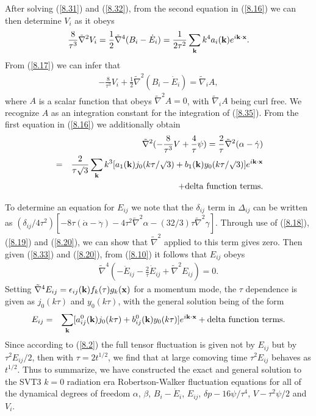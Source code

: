 After solving (\ref{8.31}) and (\ref{8.32}), from the second equation in (\ref{8.16}) we can then determine $V_i$ as it obeys 
%
\begin{eqnarray}
\frac{8}{\tau^3}\tilde{\nabla}^2V_{i}=\frac{1}{2}\tilde{\nabla}^4(B_i-\dot{E}_i)=\frac{1}{2\tau^2}\sum_{\bf k}k^4a_i({\bf k})e^{i{\bf k}\cdot{\bf x}}.
\label{8.35}
\end{eqnarray}
%
From (\ref{8.17}) we can infer that 
%
\begin{eqnarray}
-\frac{8}{\tau^3}V_{i}+\frac{1}{2}\tilde{\nabla}^2(B_i-\dot{E}_i)=\tilde{\nabla}_iA,
\label{8.36}
\end{eqnarray}
%
where $A$ is a scalar function that obeys $\tilde{\nabla}^2A=0$, with $\tilde{\nabla}_iA$ being curl free. We recognize $A$ as an integration constant for the integration of (\ref{8.35}). From the first equation in (\ref{8.16}) we additionally obtain
%
\begin{eqnarray}
&&\tilde{\nabla}^2(-\frac{8}{\tau^3}V+\frac{4}{\tau}\psi)
=\frac{2}{\tau}\tilde{\nabla}^2(\alpha-\dot{\gamma})
\nonumber\\
&=&\frac{2}{\tau\surd{3}}\sum_{\bf k}k^3[a_1({\bf k})j_0(k\tau/\surd{3})+b_1({\bf k})y_0(k\tau/\surd{3})]e^{i{\bf k}\cdot{\bf x}}
\nonumber\\
&&+ {\rm delta~function~terms.}
\label{8.37}
\end{eqnarray}
%

To determine an equation for $E_{ij}$ we note that the $\delta_{ij}$ term in $\Delta _{ij}$ can be written as 
$(\delta_{ij}/4\tau^2)[-8\tau(\dot{\alpha}-\ddot{\gamma})-4\tau^2\tilde{\nabla}^2\alpha-(32/3)\tau\tilde{\nabla}^2\gamma]$. Through use of (\ref{8.18}), (\ref{8.19}) and (\ref{8.20}), we can show that $\tilde{\nabla}^2$ applied to this term gives zero. Then given (\ref{8.33}) and (\ref{8.20}), from (\ref{8.10}) it follows that $E_{ij}$ obeys 
%
\begin{eqnarray}
\tilde{\nabla}^4\left(-\ddot{E}_{ij}-\frac{2}{\tau}\dot{E}_{ij}+\tilde{\nabla}^2E_{ij}\right)=0.
\label{8.38}
\end{eqnarray}
%
Setting $\tilde{\nabla}^4E_{ij}=\epsilon_{ij}({\bf k})f_k(\tau)g_k({\bf x})$ for a momentum mode, the $\tau$ dependence  is given as $j_0(k\tau)$ and $y_0(k\tau)$, with the general solution being of the form
%
\begin{eqnarray}
E_{ij}&=&\sum_{\bf k}[a^0_{ij}({\bf k})j_0(k\tau)+b^0_{ij}({\bf k})y_0(k\tau)]e^{i{\bf k}\cdot{\bf x}}
+ {\rm delta~function~terms}.
\label{8.39}
\end{eqnarray}
%
Since according to (\ref{8.2}) the full tensor fluctuation is given not by $E_{ij}$ but by $\tau^2E_{ij}/2$, then with $\tau=2t^{1/2}$, we find that at large comoving time  $\tau^2 E_{ij}$ behaves as $t^{1/2}$. Thus to summarize,  we have constructed the exact and general solution to the SVT3 $k=0$ radiation era Robertson-Walker fluctuation equations for all of the dynamical degrees of freedom $\alpha$, $\beta$, $B_i-\dot{E}_i$, $E_{ij}$, $\delta p-16\psi/\tau^4$, $V-\tau^2\psi/2$ and $V_i$. 

